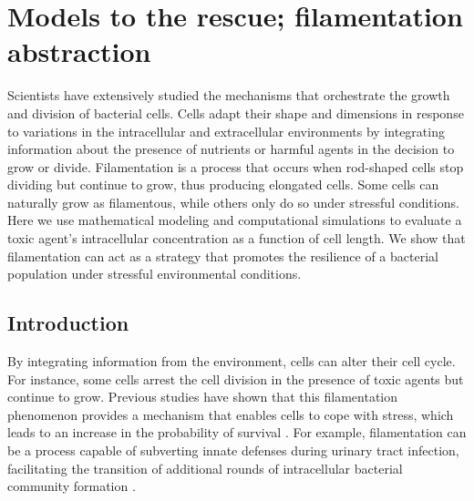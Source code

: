 \documentclass[a4paper, nobind]{templates/ociamthesis}
\begin{document}
\hypertarget{filamentation-abstraction}{%
\chapter{Models to the rescue; filamentation abstraction}\label{filamentation-abstraction}}

\minitoc 

\noindent Scientists have extensively studied the mechanisms that orchestrate the growth and division of bacterial cells. Cells adapt their shape and dimensions in response to variations in the intracellular and extracellular environments by integrating information about the presence of nutrients or harmful agents in the decision to grow or divide. Filamentation is a process that occurs when rod-shaped cells stop dividing but continue to grow, thus producing elongated cells. Some cells can naturally grow as filamentous, while others only do so under stressful conditions. Here we use mathematical modeling and computational simulations to evaluate a toxic agent's intracellular concentration as a function of cell length. We show that filamentation can act as a strategy that promotes the resilience of a bacterial population under stressful environmental conditions.

\hypertarget{introduction-2}{%
\section{Introduction}\label{introduction-2}}

By integrating information from the environment, cells can alter their cell cycle. For instance, some cells arrest the cell division in the presence of toxic agents but continue to grow. Previous studies have shown that this filamentation phenomenon provides a mechanism that enables cells to cope with stress, which leads to an increase in the probability of survival \autocite{justiceMorphologicalPlasticityBacterial2008}. For example, filamentation can be a process capable of subverting innate defenses during urinary tract infection, facilitating the transition of additional rounds of intracellular bacterial community formation \autocite{justiceFilamentationEscherichiaColi2006}.
\end{document}
